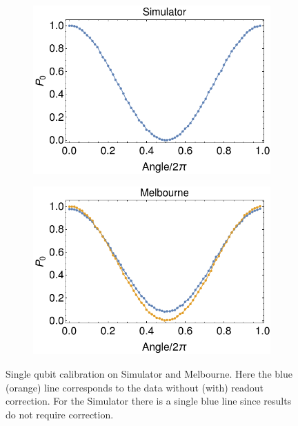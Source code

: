 \begin{figure}[H]
    \centering
    \begin{subfigure}{.5\textwidth}
      \centering
      \includegraphics[width=\textwidth]{Figures/Calibrations/calibration_simulator.png}
    \end{subfigure}%
    \begin{subfigure}{.5\textwidth}
      \centering
      \includegraphics[width=\textwidth]{Figures/Calibrations/calibration_melbourne.png}
    \end{subfigure}
    \caption{Single qubit calibration on Simulator and Melbourne. Here the blue (orange) line corresponds to the data without (with) readout correction. For the Simulator there is a single blue line since results do not require correction.}
    \label{fig:pc_yorktown_sphere}
\end{figure}



